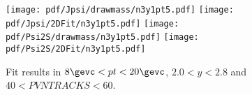 \begin{figure}[H]
\begin{center}
\texttt{[image: pdf/Jpsi/drawmass/n3y1pt5.pdf]}
\texttt{[image: pdf/Jpsi/2DFit/n3y1pt5.pdf]}
\vspace*{-0.5cm}
\texttt{[image: pdf/Psi2S/drawmass/n3y1pt5.pdf]}
\texttt{[image: pdf/Psi2S/2DFit/n3y1pt5.pdf]}
\vspace*{-0.5cm}
\end{center}
\caption{Fit results in $8\gevc<pt<20\gevc$, $2.0<y<2.8$ and $40<PVNTRACKS<60$.}
\label{Fitn3y1pt5}
\end{figure}
